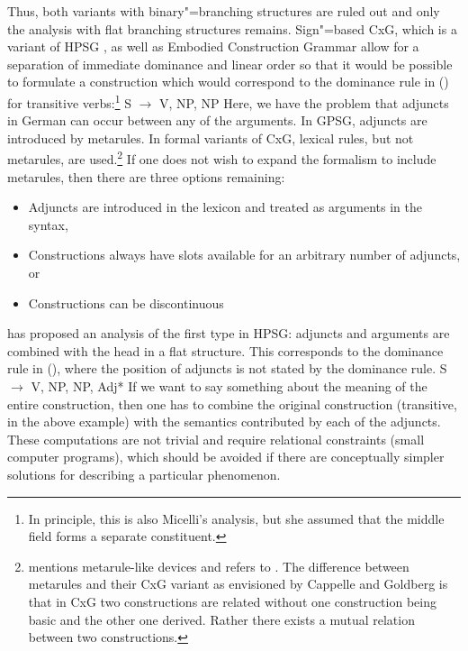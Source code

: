 Thus, both variants with binary"=branching structures are ruled out and only the analysis with flat branching structures remains.
Sign"=based CxG, which is a variant of HPSG \citep[]{Sag2010b}, as well as Embodied Construction Grammar \citep[]{BC2005a} allow for
a separation of immediate dominance and linear order so that it would be possible to
formulate a construction which would correspond to the dominance rule in () for transitive verbs:\footnote{%
	In principle, this is also Micelli's analysis, but she assumed that the middle field forms a separate constituent.%
}
\ea
S $\to$ V, NP, NP
\z
Here, we have the problem that adjuncts in German can occur between any of the arguments. In GPSG, adjuncts are introduced by metarules.
In formal variants of CxG, lexical rules, but not metarules, are used.\footnote{\label{fn-allostructions}
  \citet[]{Goldberg2014a} mentions metarule-like devices and refers to
  . The difference between metarules and their CxG variant as envisioned by
  Cappelle and Goldberg is that in CxG two
  constructions are related without one construction being basic and the other one derived. Rather
  there exists a mutual relation between two constructions.%
} If one does not wish to expand the formalism to include metarules,
then there are three options remaining:
\begin{itemize}
\item Adjuncts are introduced in the lexicon \citep*{NB94,BMS2001a} and treated as arguments in the syntax,
\item Constructions always have slots available for an arbitrary number of adjuncts, or
\item Constructions can be discontinuous
\end{itemize}
\citet{Kasper94a} has proposed an analysis of the first type in HPSG: adjuncts and arguments are combined with the head in a flat structure.
This corresponds to the dominance rule in (), where the position of adjuncts is not stated by the dominance rule.
\ea
S $\to$ V, NP, NP, Adj*
\z
If we want to say something about the meaning of the entire construction, then one has to combine the original construction (transitive, in the above example)
with the semantics contributed by each of the adjuncts. These computations are not trivial and require relational constraints (small computer programs), which
should be avoided if there are conceptually simpler solutions for describing a particular phenomenon.

